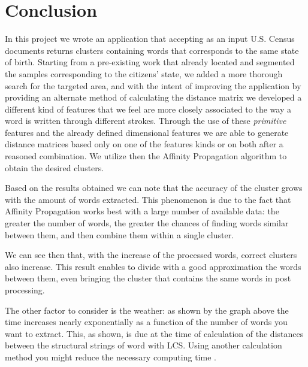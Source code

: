 \section{Conclusion}
In this project we wrote an application that accepting as an input U.S. Census documents returns clusters containing words that corresponds to the same state of birth.
Starting from a pre-existing work that already located and segmented the samples corresponding to the citizens' state, we added a more thorough search for the targeted area, and with the intent of improving the application by providing an alternate method of calculating the distance matrix we developed a different kind of features that we feel are more closely associated to the way a word is written through different strokes.
Through the use of these \textit{primitive} features and the already defined dimensional features we are able to generate distance matrices based only on one of the features kinds or on both after a reasoned combination.
We utilize then the Affinity Propagation algorithm to obtain the desired clusters.

Based on the results obtained we can note that the accuracy of the cluster grows with the amount of words extracted. This phenomenon is due to the fact that Affinity Propagation works best with a large number of available data: the greater the number of words, the greater the chances of finding words similar between them, and then combine them within a single cluster.

We can see then that, with the increase of the processed words, correct clusters also increase. This result enables to divide with a good approximation the words between them, even bringing the cluster that contains the same words in post processing.

The other factor to consider is the weather: as shown by the graph above the time increases nearly exponentially as a function of the number of words you want to extract. This, as shown, is due at the time of calculation of the distances between the structural strings of word with LCS. Using another calculation method you might reduce the necessary computing time .